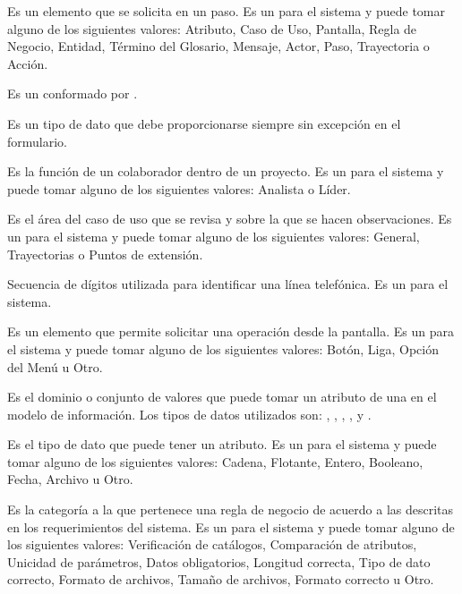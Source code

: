 \begin{description}
	 Es un elemento que se solicita en un paso. Es un  para el sistema y puede tomar alguno de los siguientes valores:
	Atributo, Caso de Uso, Pantalla, Regla de Negocio, Entidad, Término del Glosario, Mensaje, Actor, Paso, Trayectoria o Acción.
	
	 Es un   conformado por .

	 Es un tipo de dato que debe proporcionarse siempre sin excepción en el formulario.
	
	 Es la función de un colaborador dentro de un proyecto. Es un  para el sistema y puede tomar alguno de los siguientes valores:
	Analista o Líder.
	
	 Es el área del caso de uso que se revisa y sobre la que se hacen observaciones. Es un  para el sistema y puede tomar alguno de los siguientes valores:
	General, Trayectorias o Puntos de extensión.
	
	 Secuencia de dígitos utilizada para identificar una línea telefónica. Es un  para el sistema.
	
	 Es un elemento que permite solicitar una operación desde la pantalla. Es un  para el sistema y puede tomar alguno de los siguientes valores:
	Botón, Liga, Opción del Menú u Otro.
	
	 Es el dominio o conjunto de valores que puede tomar un atributo de una  en el modelo de información. Los tipos de datos 
	utilizados son: , , , ,  y 
	.
	
	 Es el tipo de dato que puede tener un atributo. Es un  para el sistema y puede tomar alguno de los siguientes valores:
	Cadena, Flotante, Entero, Booleano, Fecha, Archivo u Otro.
	
	 Es la categoría a la que pertenece una regla de negocio de acuerdo a las descritas en los requerimientos del sistema.
	Es un  para el sistema y puede tomar alguno de los siguientes valores:
	Verificación de catálogos, Comparación de atributos, Unicidad de parámetros, Datos obligatorios, Longitud correcta, Tipo de dato correcto, Formato de archivos, 
	Tamaño de archivos, Formato correcto u Otro.
	
\end{description}
